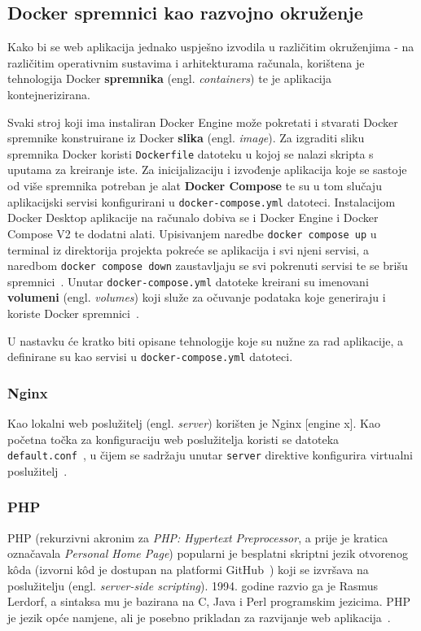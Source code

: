 \subsection{Docker spremnici kao razvojno okruženje}
Kako bi se web aplikacija jednako uspješno izvodila u različitim okruženjima - na različitim operativnim sustavima i arhitekturama računala, korištena je tehnologija Docker \textbf{spremnika} (engl. \textit{containers}) te je aplikacija kontejnerizirana.

Svaki stroj koji ima instaliran Docker Engine može pokretati i stvarati Docker spremnike konstruirane iz Docker \textbf{slika} (engl. \textit{image}). Za izgraditi sliku spremnika Docker koristi \texttt{Dockerfile} datoteku u kojoj se nalazi skripta s uputama za kreiranje iste. Za inicijalizaciju i izvođenje aplikacija koje se sastoje od više spremnika potreban je alat \textbf{Docker Compose} te su u tom slučaju aplikacijski servisi konfigurirani u \texttt{docker-compose.yml} datoteci. Instalacijom Docker Desktop aplikacije na računalo dobiva se i Docker Engine i Docker Compose V2 te dodatni alati. Upisivanjem naredbe \texttt{docker compose up} u terminal iz direktorija projekta pokreće se aplikacija i svi njeni servisi, a naredbom \texttt{docker compose down} zaustavljaju se svi pokrenuti servisi te se brišu spremnici~\cite{dockerCompose}. Unutar \texttt{docker-compose.yml} datoteke kreirani su imenovani \textbf{volumeni} (engl. \textit{volumes}) koji služe za očuvanje podataka koje generiraju i koriste Docker spremnici~\cite{dockerVolumes}.

U nastavku će kratko biti opisane tehnologije koje su nužne za rad aplikacije, a definirane su kao servisi u \texttt{docker-compose.yml} datoteci.

\subsubsection{Nginx}
Kao lokalni web poslužitelj (engl. \textit{server}) korišten je Nginx [engine x]. Kao početna točka za konfiguraciju web poslužitelja koristi se datoteka \texttt{default.conf}~\cite{nginxDeployment}, u čijem se sadržaju unutar \texttt{server} direktive konfigurira virtualni poslužitelj~\cite{nginxServer}.

\subsubsection{PHP}
PHP (rekurzivni akronim za  \textit{PHP: Hypertext Preprocessor}, a prije je kratica označavala \textit{Personal Home Page}) popularni je besplatni skriptni jezik otvorenog k\^oda (izvorni k\^od je dostupan na platformi GitHub~\cite{phpGitHub}) koji se izvršava na poslužitelju (engl. \textit{server-side scripting}). 1994. godine razvio ga je  Rasmus Lerdorf, a sintaksa mu je bazirana na C, Java i Perl programskim jezicima. PHP je jezik opće namjene, ali je posebno prikladan za razvijanje web aplikacija~\cite{Brekalo}.

